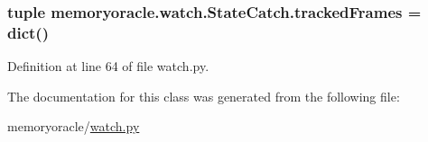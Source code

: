 \subsubsection[{tracked\+Frames}]{\setlength{\rightskip}{0pt plus 5cm}tuple memoryoracle.\+watch.\+State\+Catch.\+tracked\+Frames = dict()\hspace{0.3cm}{\ttfamily [static]}}\label{classmemoryoracle_1_1watch_1_1StateCatch_ac14780996a90f60b06a022254645a332}


Definition at line 64 of file watch.\+py.



The documentation for this class was generated from the following file\+:\begin{DoxyCompactItemize}
\item 
memoryoracle/\hyperlink{watch_8py}{watch.\+py}\end{DoxyCompactItemize}
